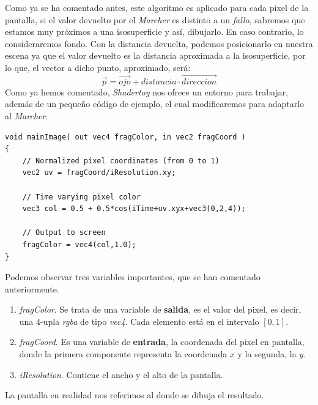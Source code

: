 \newpage
Como ya se ha comentado antes, este algoritmo es aplicado para cada pixel de la pantalla, si el valor devuelto por el \textit{Marcher} es distinto a un \textit{fallo}, sabremos que estamos muy próximos a una isosuperficie y así, dibujarlo. En caso contrario, lo consideraremos fondo. Con la distancia devuelta, podemos posicionarlo en nuestra escena ya que el valor devuelto es la distancia aproximada a la isosuperficie, por lo que, el vector a dicho punto, aproximado, será:
\[ \Vec{p} = \Vec{ojo} + distancia \cdot  \Vec{direccion} \]
Como ya hemos comentado, \textit{Shadertoy} nos ofrece un entorno para trabajar, además de un pequeño código de ejemplo, el cual modificaremos para adaptarlo al \textit{Marcher}.
\begin{lstlisting}
void mainImage( out vec4 fragColor, in vec2 fragCoord )
{
    // Normalized pixel coordinates (from 0 to 1)
    vec2 uv = fragCoord/iResolution.xy;

    // Time varying pixel color
    vec3 col = 0.5 + 0.5*cos(iTime+uv.xyx+vec3(0,2,4));

    // Output to screen
    fragColor = vec4(col,1.0);
}
\end{lstlisting}
Podemos observar tres variables importantes, que se han comentado anteriormente.
\begin{enumerate}
    \item \textit{fragColor}. Se trata de una variable de \textbf{salida}, es el valor del pixel, es decir, una 4-upla \textit{rgba} de tipo \textit{vec4}. Cada elemento está en el intervalo \([0,1]\).
    \item \textit{fragCoord}. Es una variable de \textbf{entrada}, la coordenada del pixel en pantalla, donde la primera componente representa la coordenada \(x\) y la segunda, la \(y\).
    \item \textit{iResolution}. Contiene el ancho y el alto de la pantalla.
\end{enumerate}
La pantalla en realidad nos referimos al donde se dibuja el resultado.
\newpage
